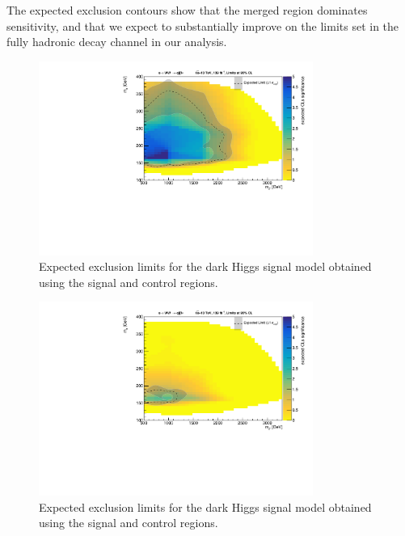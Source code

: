 The expected exclusion contours show that the merged region dominates sensitivity, and that we expect to substantially improve on the limits set in the fully hadronic decay channel in our analysis.

\begin{figure}[h]
    \centering
    \includegraphics[width=0.8\textwidth]{Figures/5/fits/MERGED.pdf}
    \caption{Expected exclusion limits for the dark Higgs signal model obtained using the \merged signal and control regions.}
    \label{fig:excl_mgd}
\end{figure}

\begin{figure}[h]
    \centering
    \includegraphics[width=0.8\textwidth]{Figures/5/fits/RESOLVED.pdf}
    \caption{Expected exclusion limits for the dark Higgs signal model obtained using the \resolved signal and control regions.}
    \label{fig:excl_res}
\end{figure}

